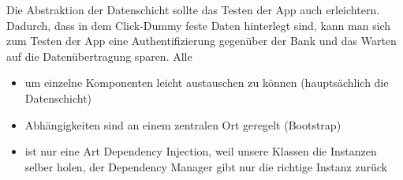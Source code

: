 	Die Abstraktion der Datenschicht sollte das Testen der App auch erleichtern. Dadurch, dass in dem Click-Dummy feste Daten hinterlegt sind, kann man sich zum Testen der App eine Authentifizierung gegenüber der Bank und das Warten auf die Datenübertragung sparen. Alle 
	
\begin{itemize}
	\item um einzelne Komponenten leicht austauschen zu können (hauptsächlich die Datenschicht)
	\item Abhängigkeiten sind an einem zentralen Ort geregelt (Bootstrap)
	\item ist nur eine Art Dependency Injection, weil unsere Klassen die Instanzen selber holen, der Dependency Manager gibt nur die richtige Instanz zurück
\end{itemize}